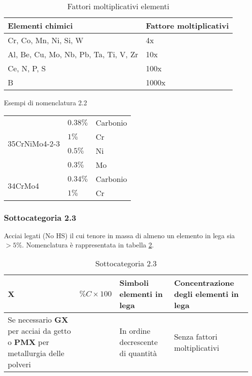 \begin{table}
\centering
\caption{Fattori moltiplicativi elementi}\label{tab:FattoriElementi}
\begin{tabularx}{\textwidth}{XX}
\toprule
\textbf{Elementi chimici} & \textbf{Fattore moltiplicativi}\\
\midrule
Cr, Co, Mn, Ni, Si, W & 4x\\
\midrule
Al, Be, Cu, Mo, Nb, Pb, Ta, Ti, V, Zr & 10x\\
\midrule
Ce, N, P, S & 100x\\
\midrule
B & 1000x\\
\bottomrule
\end{tabularx}
\end{table}

\begin{example}{Esempi di nomenclatura 2.2}
\begin{tabularx}{\textwidth}{XXX}
\multirow{4}{*}{35CrNiMo4-2-3} & $0.38\%$ & Carbonio\\
	& $1\%$ & Cr\\
	& $0.5\%$ & Ni\\
	& $0.3\%$ & Mo\\
\midrule
\multirow{2}{*}{34CrMo4} & $0.34\%$ & Carbonio\\
	& $1\%$ & Cr\\
\bottomrule
\end{tabularx}
\end{example}

\subsubsection{Sottocategoria 2.3}
Acciai legati (No HS) il cui tenore in massa di almeno un elemento in lega sia $>5\%$.
Nomenclatura è rappresentata in tabella \ref{tab:Sotto3}.

\begin{table}
\centering
\caption{Sottocategoria 2.3}\label{tab:Sotto3}
\begin{tabularx}{\textwidth}{|X|X|X|X|}
\textbf{X} & \textbf{$\%C \times 100$} & \textbf{Simboli elementi in lega} & \textbf{Concentrazione degli elementi in lega}\\
\midrule
Se necessario \textbf{GX} per acciai da getto o \textbf{PMX} per metallurgia delle polveri &&
In ordine decrescente di quantità &
Senza fattori moltiplicativi\\
\end{tabularx}
\end{table}

